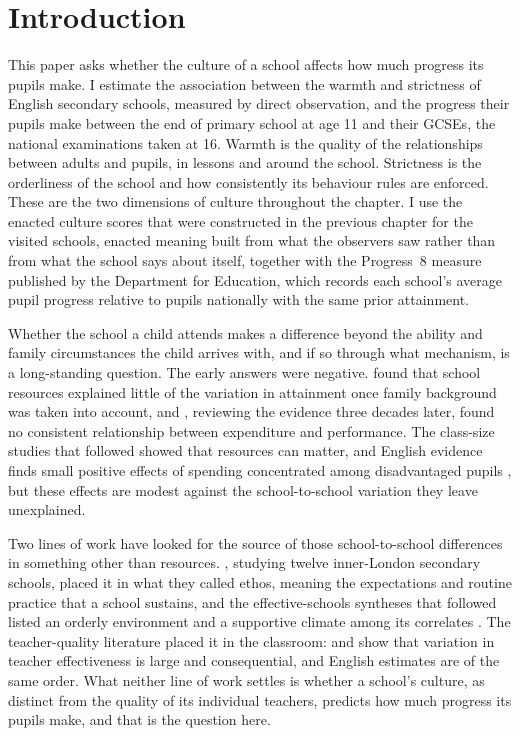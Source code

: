\section{Introduction}
\label{sec:p2_intro}

This paper asks whether the culture of a school affects how much progress
its pupils make. I estimate the association between the warmth and strictness of
English secondary schools, measured by direct observation, and the progress their pupils make between the end of primary school at age 11 and their GCSEs, the national examinations taken at 16. Warmth is the quality of the relationships between adults and pupils, in lessons and around the school. Strictness is the orderliness of the school and how consistently its behaviour rules are enforced. These are the two dimensions of culture throughout the chapter. I use the enacted culture scores that were constructed in the previous chapter for the \NTierOne{} visited schools, enacted meaning built from what the observers saw rather than from what the school says about itself, together with the Progress~8 measure
published by the Department for Education, which records each school's
average pupil progress relative to pupils nationally with the same prior
attainment.

Whether the school a child attends makes a difference beyond the ability and family circumstances the child arrives with, and if so through what mechanism, is a long-standing question. The early answers were negative.
\citet{coleman1966} found that school resources explained little of the
variation in attainment once family background was taken into account, and
\citet{hanushek1997}, reviewing the evidence three decades later, found no consistent relationship between expenditure and performance. The class-size studies that followed \citep{krueger1999,krueger2001,angrist1999} showed that resources can matter, and English evidence finds small positive effects of spending concentrated among disadvantaged pupils \citep{levacic2005,jenkins2006,holmlund2010,machin2010}, but these effects are modest against the school-to-school variation they leave unexplained.

Two lines of work have looked for the source of those school-to-school differences in something other than resources. \citet{rutter1979}, studying twelve inner-London
secondary schools, placed it in what they called ethos, meaning the
expectations and routine practice that a school sustains, and the
effective-schools syntheses that followed listed an orderly environment and
a supportive climate among its correlates
\citep{edmonds1979,sammons1995,teddlie2000}. The teacher-quality literature
placed it in the classroom: \citet{rivkin2005} and \citet{chetty2014} show
that variation in teacher effectiveness is large and consequential, and
English estimates \citep{slater2012,murphy2011} are of the same order. What
neither line of work settles is whether a school's culture, as distinct from
the quality of its individual teachers, predicts how much progress its pupils
make, and that is the question here.

